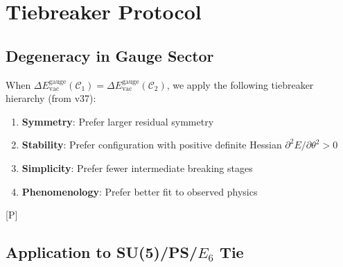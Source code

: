 \documentclass[11pt,a4paper]{article}
\newcommand{\tagP}{\textcolor{green!50!black}{[P]}}
\begin{document}
\section{Tiebreaker Protocol}
\label{sec:tiebreaker}

\subsection{Degeneracy in Gauge Sector}

When $\Delta E_{\text{vac}}^{\text{gauge}}(\mathcal{C}_1) = \Delta E_{\text{vac}}^{\text{gauge}}(\mathcal{C}_2)$,
we apply the following tiebreaker hierarchy (from v37):

\begin{enumerate}
    \item \textbf{Symmetry}: Prefer larger residual symmetry
    \item \textbf{Stability}: Prefer configuration with positive definite Hessian $\partial^2 E/\partial\theta^2 > 0$
    \item \textbf{Simplicity}: Prefer fewer intermediate breaking stages
    \item \textbf{Phenomenology}: Prefer better fit to observed physics
\end{enumerate}

\tagP

\subsection{Application to SU(5)/PS/$E_6$ Tie}
\end{document}
